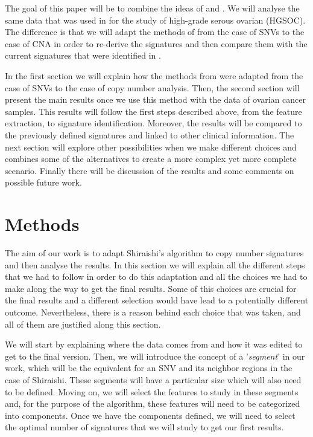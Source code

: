 \documentclass[a4paper]{article}
\begin{document}
The goal of this paper will be to combine the ideas of  \cite{Geoff} and \cite{Shira}. We will analyse the same data that was used in \cite{Geoff} for the study of high-grade
serous ovarian (HGSOC). The difference is that we will adapt the methods of \cite{Shira} from the case of SNVs to the case of CNA in order to re-derive the signatures and then compare them with the current signatures that were identified in \cite{Geoff}.

In the first  section we will explain how the methods from  \cite{Shira} were adapted from the case of SNVs to the case of copy number analysis. Then, the second section will present the main results once we use this method with the data of ovarian cancer samples. This results will follow the first steps described above, from the feature extraction, to signature identification. Moreover, the results will be compared to the previously defined signatures and linked to other clinical information. The next section will explore other possibilities when we make different choices and combines some of the alternatives to create a more complex yet more complete scenario. Finally there will be discussion of the results and some comments on possible future work.  

\section{Methods}
The aim of our work is to adapt Shiraishi's algorithm to copy number signatures and then analyse the results. In this section we will explain all the different steps that we had to follow in order to do this adaptation and all the choices we had to make along the way to get the final results. Some of this choices are crucial for the final results and a different selection would have lead to a potentially different outcome. Nevertheless, there is a reason behind each choice that was taken, and all of them are justified along this section. 

We will start by explaining where the data comes from and how it was edited to get to the final version. Then, we will introduce the concept of a '\textit{segment}' in our work, which will be the equivalent for an SNV and its neighbor regions in the case of Shiraishi. These segments will have a particular size which will also need to be defined. Moving on, we will select the features to study in these segments and, for the purpose of the algorithm, these features will need to be categorized into components. Once we have the components defined, we will need to select the optimal number of signatures that we will study to get our first results.
\end{document}
